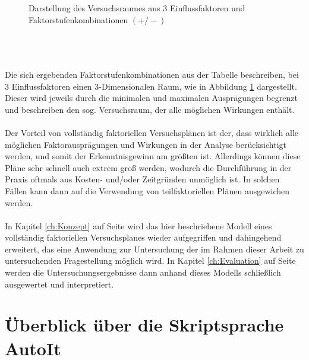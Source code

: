 \documentclass[
fontsize=10pt, 
listof = totoc,
parskip = half	
]{report}
\begin{document}
\begin{minipage}[t]{0.59\linewidth}
\begin{figure}[H]
\begin{tikzpicture}[x=0.75pt,y=0.75pt,yscale=-1,xscale=1, scale=0.6, every node/.style={scale=0.6}]
		\end{tikzpicture}
		\caption{Darstellung des Versuchsraumes aus 3 Einflussfaktoren und Faktorstufenkombinationen $(+/-)$}
		\label{fig:Versuchsplan}
	\end{figure}
\end{minipage}
\\\\\\
\noindent Die sich ergebenden Faktorstufenkombinationen aus der Tabelle beschreiben, bei 3 Einflussfaktoren einen 3-Dimensionalen Raum, wie in Abbildung \ref{fig:Versuchsplan} dargestellt. Dieser wird jeweils durch die minimalen und maximalen Ausprägungen begrenzt und beschreiben den sog. Versuchsraum, der alle möglichen Wirkungen enthält. 
\\\\
\noindent Der Vorteil von vollständig faktoriellen Versuchsplänen ist der, dass wirklich alle möglichen Faktorausprägungen und Wirkungen in der Analyse berücksichtigt werden, und somit der Erkenntnisgewinn am größten ist. Allerdings können diese Pläne sehr schnell auch extrem groß werden, wodurch die Durchführung in der Praxis oftmals aus Kosten- und/oder Zeitgründen unmöglich ist. In solchen  Fällen kann dann auf die Verwendung von teilfaktoriellen Plänen ausgewichen werden.
\\\\
\noindent In Kapitel \ref{ch:Konzept} auf Seite \pageref{ch:Konzept} wird das hier beschriebene Modell eines vollständig faktoriellen Versuchsplanes wieder aufgegriffen und dahingehend erweitert, das eine Anwendung zur Untersuchung der im Rahmen dieser Arbeit zu untersuchenden Fragestellung möglich wird. In Kapitel \ref{ch:Evaluation} auf Seite \pageref{ch:Evaluation} werden die Untersuchungsergebnisse dann anhand dieses Modells schließlich ausgewertet und interpretiert.

\section{Überblick über die Skriptsprache AutoIt}
\label{sec:UeberblickAutoIt}
\end{document}
